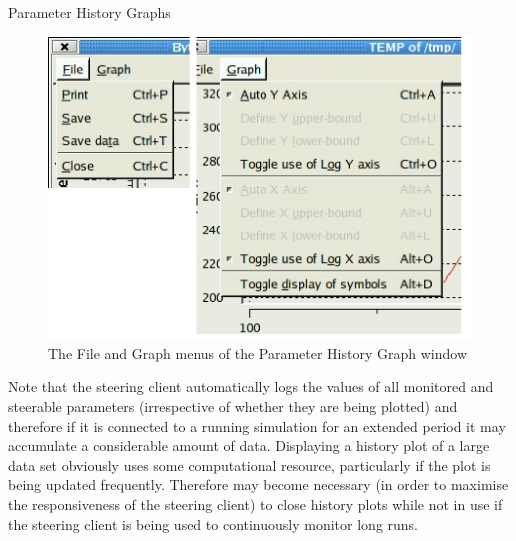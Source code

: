 \documentclass[a4paper,twoside]{article}
\begin{document}
\begin{section}{Parameter History Graphs}
\begin{figure}
\centerline{\includegraphics{hist_plot_menus.eps}}
\caption{The File and Graph menus of the Parameter History Graph window}
\label{fig:param_hist_menus}
\end{figure}

Note that the steering client automatically logs the values of all
monitored and steerable parameters (irrespective of whether they are
being plotted) and therefore if it is connected to a running
simulation for an extended period it may accumulate a considerable
amount of data.  Displaying a history plot of a large data set
obviously uses some computational resource, particularly if the plot
is being updated frequently.  Therefore may become necessary (in order to
maximise the responsiveness of the steering client) to close history plots
while not in use if the steering client is being used to
continuously monitor long runs.

\end{section} %

\end{document}
